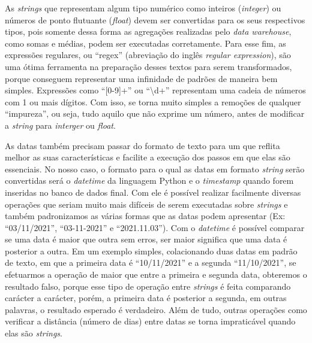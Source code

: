 As \textit{strings} que representam algum tipo numérico como inteiros (\textit{integer}) ou números de ponto flutuante (\textit{float}) devem ser convertidas para os seus respectivos tipos, pois somente dessa forma as agregações realizadas pelo \textit{data warehouse}, como somas e médias, podem ser executadas corretamente. Para esse fim, as expressões regulares, ou \enquote{regex} (abreviação do inglês \textit{regular expression}), são uma ótima ferramenta na preparação desses textos para serem transformados, porque conseguem representar uma infinidade de padrões de maneira bem simples. Expressões como \enquote{[0-9]+} ou \enquote{\textbackslash d+} representam uma cadeia de números com 1 ou mais dígitos. Com isso, se torna muito simples a remoções de qualquer \enquote{impureza}, ou seja, tudo aquilo que não exprime um número, antes de modificar a \textit{string} para \textit{interger} ou \textit{float}.

As datas também precisam passar do formato de texto para um que reflita melhor as suas características e facilite a execução dos passos em que elas são essenciais. No nosso caso, o formato para o qual as datas em formato \textit{string} serão convertidas será o \textit{datetime} da linguagem Python e o \textit{timestamp} quando forem inseridas no banco de dados final. Com ele é possível realizar facilmente diversas operações que seriam muito mais difíceis de serem executadas sobre \textit{strings} e também padronizamos as várias formas que as datas podem apresentar (Ex: \enquote{03/11/2021}, \enquote{03-11-2021} e \enquote{2021.11.03}). Com o \textit{datetime} é possível comparar se uma data é maior que outra sem erros, ser maior significa que uma data é posterior a outra. Em um exemplo simples, colacionando duas datas em padrão de texto, em que a primeira data é \enquote{10/11/2021} e a segunda \enquote{11/10/2021}, se efetuarmos a operação de maior que entre a primeira e segunda data, obteremos o resultado falso, porque esse tipo de operação entre \textit{strings} é feita comparando carácter a carácter, porém, a primeira data é posterior a segunda, em outras palavras, o resultado esperado é verdadeiro. Além de tudo, outras operações como verificar a distância (número de dias) entre datas se torna impraticável quando elas são \textit{strings}.

